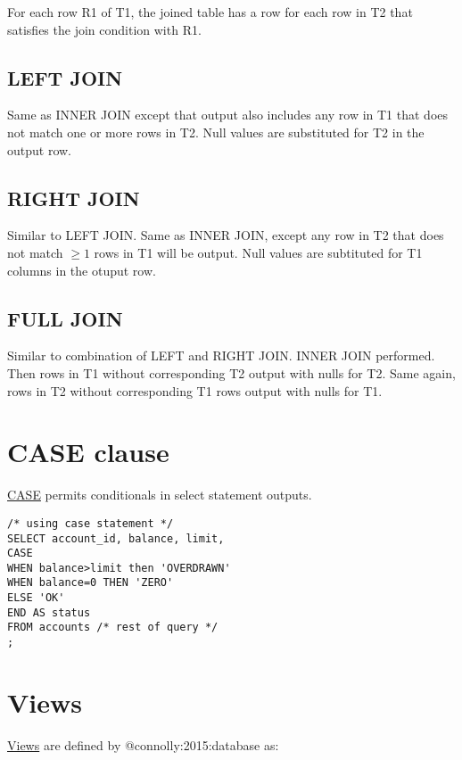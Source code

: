 For each row R1 of T1, the joined table has a row for each row in T2
that satisfies the join condition with R1.

\subsection{LEFT JOIN}\label{left-join}

Same as INNER JOIN except that output also includes any row in T1 that
does not match one or more rows in T2. Null values are substituted for
T2 in the output row.

\subsection{RIGHT JOIN}\label{right-join}

Similar to LEFT JOIN. Same as INNER JOIN, except any row in T2 that does
not match \(\ge 1\) rows in T1 will be output. Null values are
subtituted for T1 columns in the otuput row.

\subsection{FULL JOIN}\label{full-join}

Similar to combination of LEFT and RIGHT JOIN. INNER JOIN performed.
Then rows in T1 without corresponding T2 output with nulls for T2. Same
again, rows in T2 without corresponding T1 rows output with nulls for
T1.

\section{CASE clause}\label{case-clause}

\href{https://www.postgresql.org/docs/13/functions-conditional.html\#FUNCTIONS-CASE}{CASE}
permits conditionals in select statement outputs.

\begin{verbatim}
/* using case statement */ 
SELECT account_id, balance, limit,
CASE 
WHEN balance>limit then 'OVERDRAWN' 
WHEN balance=0 THEN 'ZERO' 
ELSE 'OK' 
END AS status
FROM accounts /* rest of query */
;
\end{verbatim}

\section{Views}\label{sec:views}

\href{https://www.postgresql.org/docs/13/tutorial-views.html}{Views} are
defined by @connolly:2015:database as:

